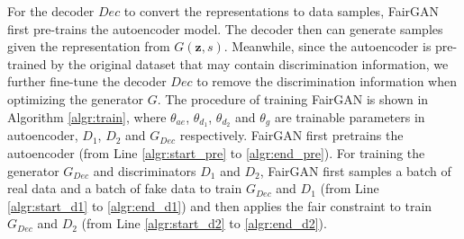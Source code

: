 \documentclass[sigconf]{acmart}
\theoremstyle{definition}
\begin{document}
For the decoder $Dec$ to convert the representations to data samples, FairGAN first pre-trains the autoencoder model. The decoder then can generate samples given the representation from $G(\mathbf{z},s)$. Meanwhile, since the autoencoder is pre-trained by the original dataset that may contain discrimination information, we further fine-tune the decoder $Dec$ to remove the discrimination information when optimizing the generator $G$. 
The procedure of training FairGAN is shown in Algorithm \ref{algr:train}, where $\theta_{ae}$, $\theta_{d_1}$, $\theta_{d_2}$ and $\theta_{g}$ are trainable parameters in autoencoder, $D_1$, $D_2$ and $G_{Dec}$ respectively. FairGAN first pretrains the autoencoder (from Line \ref{algr:start_pre} to \ref{algr:end_pre}). For training the generator $G_{Dec}$ and discriminators $D_1$ and $D_2$, FairGAN first samples a batch of real data and a batch of fake data to train $G_{Dec}$ and $D_1$ (from Line \ref{algr:start_d1} to \ref{algr:end_d1}) and then applies the fair constraint to train $G_{Dec}$ and $D_2$ (from Line \ref{algr:start_d2} to \ref{algr:end_d2}). 
\end{document}
